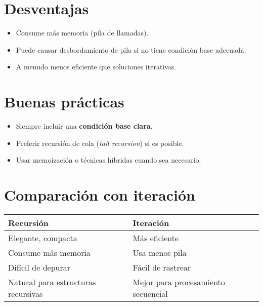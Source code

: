 \documentclass[a4paper]{article}
\begin{document}
\section{Desventajas}

\begin{itemize}
    \item Consume más memoria (pila de llamadas).
    \item Puede causar desbordamiento de pila si no tiene condición base adecuada.
    \item A menudo menos eficiente que soluciones iterativas.
\end{itemize}

\section{Buenas prácticas}

\begin{itemize}
    \item Siempre incluir una \textbf{condición base clara}.
    \item Preferir recursión de cola (\textit{tail recursion}) si es posible.
    \item Usar memoización o técnicas híbridas cuando sea necesario.
\end{itemize}

\section{Comparación con iteración}

\begin{tabular}{|l|l|}
\hline
\textbf{Recursión} & \textbf{Iteración} \\
\hline
Elegante, compacta & Más eficiente \\
Consume más memoria & Usa menos pila \\
Difícil de depurar & Fácil de rastrear \\
Natural para estructuras recursivas & Mejor para procesamiento secuencial \\
\hline
\end{tabular}
\end{document}
